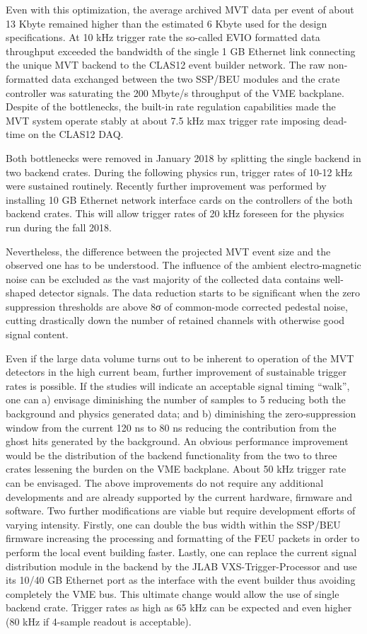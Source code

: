 Even with this optimization, the average archived MVT data per event of about 13 Kbyte remained higher than the 
estimated 6 Kbyte used for the design specifications. At 10 kHz trigger rate the so-called EVIO formatted data 
throughput exceeded the bandwidth of the single 1 GB Ethernet link connecting the unique MVT backend to the CLAS12 
event builder network. The raw non-formatted data exchanged between the two SSP/BEU modules and the crate controller 
was saturating the 200 Mbyte/s throughput of the VME backplane. Despite of the bottlenecks, the built-in rate 
regulation capabilities made the MVT system operate stably at about 7.5 kHz max trigger rate imposing dead-time on the 
CLAS12 DAQ. 

Both bottlenecks were removed in January 2018 by splitting the single backend in two backend crates. During the 
following physics run, trigger rates of 10-12 kHz were sustained routinely. Recently further improvement was performed 
by installing 10 GB Ethernet network interface cards on the controllers of the both backend crates. This will allow 
trigger rates of 20 kHz foreseen for the physics run during the fall 2018.

Nevertheless, the difference between the projected MVT event size and the observed one has to be understood. The 
influence of the ambient electro-magnetic noise can be excluded as the vast majority of the collected data contains 
well-shaped detector signals. The data reduction starts to be significant when the zero suppression thresholds are 
above 8σ of common-mode corrected pedestal noise, cutting drastically down the number of retained channels with 
otherwise good signal content.

Even if the large data volume turns out to be inherent to operation of the MVT detectors in the high current beam, 
further improvement of sustainable trigger rates is possible. If the studies will indicate an acceptable signal timing 
“walk”, one can a) envisage diminishing the number of samples to 5 reducing both the background and physics generated 
data; and b) diminishing the zero-suppression window from the current 120 ns to 80 ns reducing the contribution from 
the ghost hits generated by the background. An obvious performance improvement would be the distribution of the backend 
functionality from the two to three crates lessening the burden on the VME backplane. About 50 kHz trigger rate can be 
envisaged. The above improvements do not require any additional developments and are already supported by the current 
hardware, firmware and software. Two further modifications are viable but require development efforts of varying 
intensity. Firstly, one can double the bus width within the SSP/BEU firmware increasing the processing and formatting 
of the FEU packets in order to perform the local event building faster. Lastly, one can replace the current signal 
distribution module in the backend by the JLAB VXS-Trigger-Processor and use its 10/40 GB Ethernet port as the 
interface with the event builder thus avoiding completely the VME bus. This ultimate change would allow the use of 
single backend crate. Trigger rates as high as 65 kHz can be expected and even higher (80 kHz if 4-sample readout is 
acceptable).
